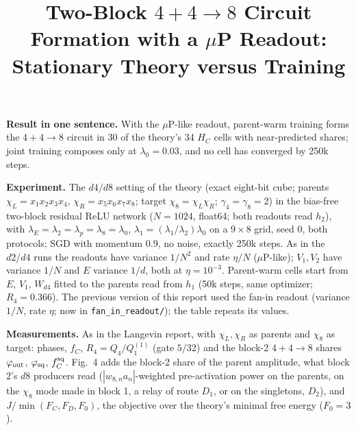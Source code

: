\documentclass[10pt]{article}
\title{\vspace{-1.15cm}\textbf{Two-Block $4{+}4{\to}8$ Circuit Formation with a $\mu$P Readout:\\Stationary Theory versus Training}}
\author{}
\date{\vspace{-1.3cm}}
\begin{document}
\maketitle
\vspace{-0.75cm}

\textbf{Result in one sentence.}
With the $\mu$P-like readout, parent-warm training forms the $4{+}4{\to}8$ circuit in 30 of the
theory's 34 $H_C$ cells with near-predicted shares; joint training composes only at
$\lambda_0=0.03$, and no cell has converged by 250k steps.

\textbf{Experiment.}
The $d4/d8$ setting of the theory (exact eight-bit cube; parents $\chi_L=x_1x_2x_3x_4$,
$\chi_R=x_5x_6x_7x_8$; target $\chi_8=\chi_L\chi_R$; $\gamma_4=\gamma_8=2$) in the bias-free
two-block residual ReLU network ($N=1024$, float64; both readouts read $h_2$), with
$\lambda_E=\lambda_2=\lambda_p=\lambda_8=\lambda_0$, $\lambda_1=(\lambda_1/\lambda_2)\lambda_0$
on a $9\times8$ grid, seed 0, both protocols; SGD with momentum 0.9, no noise, exactly 250k steps.
As in the $d2/d4$ runs the readouts have variance $1/N^2$ and rate $\eta/N$ ($\mu$P-like);
$V_1,V_2$ have variance $1/N$ and $E$ variance $1/d$, both at $\eta=10^{-3}$.  Parent-warm cells
start from $E$, $V_1$, $W_{d4}$ fitted to the parents read from $h_1$ (50k steps, same
optimizer; $R_4=0.366$).  The previous version of this report used the fan-in readout (variance
$1/N$, rate $\eta$; now in \texttt{fan\_in\_readout/}); the table repeats its values.

\textbf{Measurements.}  As in the Langevin report, with $\chi_L,\chi_R$ as parents and $\chi_8$ as
target: phases, $f_C$, $R_4=Q_4/Q_1^{(1)}$ (gate $5/32$) and the block-2 $4{+}4{\to}8$ shares
$\varphi_{\rm out}$, $\varphi_{\rm sq}$, $f_C^{\rm sq}$.  Fig.~4 adds the block-2 share of the parent
amplitude, what block 2's $d8$ producers read ($|w_{8,n}a_n|$-weighted pre-activation power on
the parents, on the $\chi_8$ mode made in block 1, a relay of route $D_1$, or on the singletons,
$D_2$), and $J/\min(F_C,F_D,F_0)$, the objective over the theory's minimal free energy
($F_0=3$).
\end{document}
